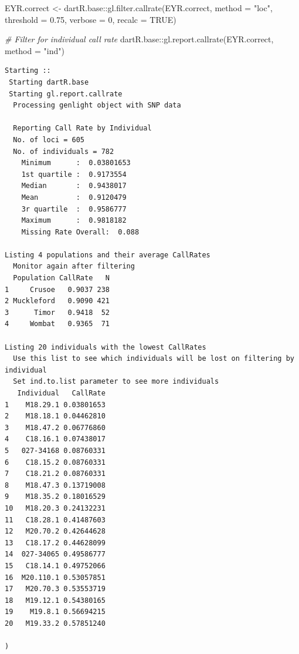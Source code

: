 \documentclass[
  letterpaper,
  DIV=11,
  numbers=noendperiod]{scrreprt}
\newenvironment{Shaded}{\begin{snugshade}}{\end{snugshade}}
\newcommand{\AttributeTok}[1]{\textcolor[rgb]{0.49,0.56,0.16}{#1}}
\newcommand{\CommentTok}[1]{\textcolor[rgb]{0.38,0.63,0.69}{\textit{#1}}}
\newcommand{\ConstantTok}[1]{\textcolor[rgb]{0.53,0.00,0.00}{#1}}
\newcommand{\DecValTok}[1]{\textcolor[rgb]{0.25,0.63,0.44}{#1}}
\newcommand{\FloatTok}[1]{\textcolor[rgb]{0.25,0.63,0.44}{#1}}
\newcommand{\FunctionTok}[1]{\textcolor[rgb]{0.02,0.16,0.49}{#1}}
\newcommand{\NormalTok}[1]{\textcolor[rgb]{0.00,0.44,0.13}{#1}}
\newcommand{\OtherTok}[1]{\textcolor[rgb]{0.00,0.44,0.13}{#1}}
\newcommand{\SpecialCharTok}[1]{\textcolor[rgb]{0.25,0.44,0.63}{#1}}
\newcommand{\StringTok}[1]{\textcolor[rgb]{0.25,0.44,0.63}{#1}}
\let\textttOrig\texttt
\renewcommand{\texttt}[1]{\textttOrig{\color{blue}{#1}}}
\begin{document}
\begin{Shaded}
\begin{Highlighting}[]
\NormalTok{EYR.correct }\OtherTok{\textless{}{-}}\NormalTok{ dartR.base}\SpecialCharTok{::}\FunctionTok{gl.filter.callrate}\NormalTok{(EYR.correct, }\AttributeTok{method =} \StringTok{"loc"}\NormalTok{,}
    \AttributeTok{threshold =} \FloatTok{0.75}\NormalTok{, }\AttributeTok{verbose =} \DecValTok{0}\NormalTok{, }\AttributeTok{recalc =} \ConstantTok{TRUE}\NormalTok{)}

\CommentTok{\# Filter for individual call rate}
\NormalTok{dartR.base}\SpecialCharTok{::}\FunctionTok{gl.report.callrate}\NormalTok{(EYR.correct, }\AttributeTok{method =} \StringTok{"ind"}\NormalTok{)}
\end{Highlighting}
\end{Shaded}

\begin{verbatim}
Starting :: 
 Starting dartR.base 
 Starting gl.report.callrate 
  Processing genlight object with SNP data

  Reporting Call Rate by Individual
  No. of loci = 605 
  No. of individuals = 782 
    Minimum      :  0.03801653 
    1st quartile :  0.9173554 
    Median       :  0.9438017 
    Mean         :  0.9120479 
    3r quartile  :  0.9586777 
    Maximum      :  0.9818182 
    Missing Rate Overall:  0.088 

Listing 4 populations and their average CallRates
  Monitor again after filtering
  Population CallRate   N
1     Crusoe   0.9037 238
2 Muckleford   0.9090 421
3      Timor   0.9418  52
4     Wombat   0.9365  71

Listing 20 individuals with the lowest CallRates
  Use this list to see which individuals will be lost on filtering by individual
  Set ind.to.list parameter to see more individuals
   Individual   CallRate
1    M18.29.1 0.03801653
2    M18.18.1 0.04462810
3    M18.47.2 0.06776860
4    C18.16.1 0.07438017
5   027-34168 0.08760331
6    C18.15.2 0.08760331
7    C18.21.2 0.08760331
8    M18.47.3 0.13719008
9    M18.35.2 0.18016529
10   M18.20.3 0.24132231
11   C18.28.1 0.41487603
12   M20.70.2 0.42644628
13   C18.17.2 0.44628099
14  027-34065 0.49586777
15   C18.14.1 0.49752066
16  M20.110.1 0.53057851
17   M20.70.3 0.53553719
18   M19.12.1 0.54380165
19    M19.8.1 0.56694215
20   M19.33.2 0.57851240

)
\end{verbatim}

\begin{figure}[H]

{\centering \texttt{[image: Session10\_SexLinkedMarkers\_files/figure-pdf/unnamed-chunk-14-8.pdf]}

}

\end{figure}
\end{document}
